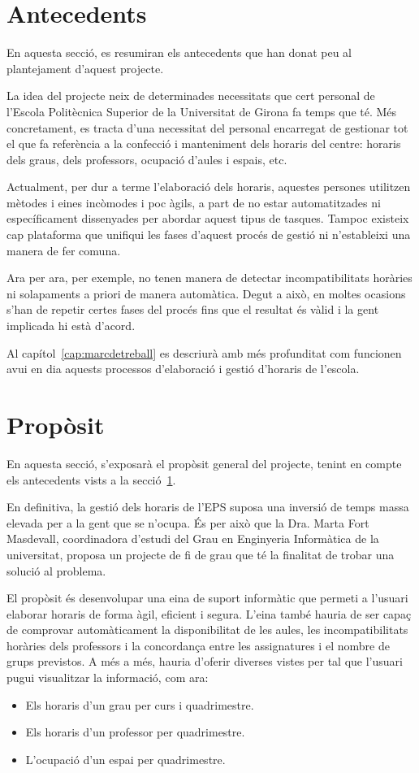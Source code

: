 \documentclass[a4paper,12pt]{ThesisStyle}
\begin{document}
\section{Antecedents}
\label{sec:antecedents}

En aquesta secció, es resumiran els antecedents que han donat peu al plantejament d'aquest projecte.

La idea del projecte neix de determinades necessitats que cert personal de l'Escola Politècnica Superior de la Universitat de Girona fa temps que té. Més concretament, es tracta d'una necessitat del personal encarregat de gestionar tot el que fa referència a la confecció i manteniment dels horaris del centre: horaris dels graus, dels professors, ocupació d'aules i espais, etc.

Actualment, per dur a terme l'elaboració dels horaris, aquestes persones utilitzen mètodes i eines incòmodes i poc àgils, a part de no estar automatitzades ni específicament dissenyades per abordar aquest tipus de tasques. Tampoc existeix cap plataforma que unifiqui les fases d'aquest procés de gestió ni n'estableixi una manera de fer comuna.

Ara per ara, per exemple, no tenen manera de detectar incompatibilitats horàries ni solapaments a priori de manera automàtica. Degut a això, en moltes ocasions s'han de repetir certes fases del procés fins que el resultat és vàlid i la gent implicada hi està d'acord. 

Al capítol~\ref{cap:marcdetreball} es descriurà amb més profunditat com funcionen avui en dia aquests processos d'elaboració i gestió d'horaris de l'escola.

\section{Propòsit}
\label{sec:proposit}

En aquesta secció, s'exposarà el propòsit general del projecte, tenint en compte els antecedents vists a la secció~\ref{sec:antecedents}.

En definitiva, la gestió dels horaris de l'EPS suposa una inversió de temps massa elevada per a la gent que se n'ocupa. És per això que la Dra. Marta Fort Masdevall, coordinadora d'estudi del Grau en Enginyeria Informàtica de la universitat, proposa un projecte de fi de grau que té la finalitat de trobar una solució al problema.

El propòsit és desenvolupar una eina de suport informàtic que permeti a l'usuari elaborar horaris de forma àgil, eficient i segura. L'eina també hauria de ser capaç de comprovar automàticament la disponibilitat de les aules, les incompatibilitats horàries dels professors i la concordança entre les assignatures i el nombre de grups previstos. A més a més, hauria d'oferir diverses vistes per tal que l'usuari pugui visualitzar la informació, com ara:
\begin{itemize}
  \item Els horaris d'un grau per curs i quadrimestre.
  \item Els horaris d'un professor per quadrimestre.
  \item L'ocupació d'un espai per quadrimestre.
\end{itemize}
\end{document}
